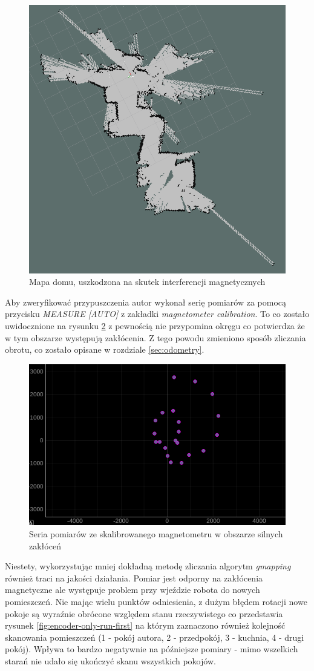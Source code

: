 \begin{figure}[ht]
	\centering
	    \includegraphics[width=0.6\linewidth]{rys/2020-11-04-170347_1920x1080_scrot.PNG}
	\caption{Mapa domu, uszkodzona na skutek interferencji magnetycznych}
	\label{fig:mag-interference-first}
\end{figure}

Aby zweryfikować przypuszczenia autor wykonał serię pomiarów za pomocą przycisku \emph{MEASURE [AUTO]} z zakładki \emph{magnetometer calibration}. To co zostało uwidocznione na rysunku \ref{fig:mag-interference-graph} z pewnością nie przypomina okręgu co potwierdza że w tym obszarze występują zakłócenia. Z tego powodu zmieniono sposób zliczania obrotu, co zostało opisane w rozdziale \ref{sec:odometry}.

\begin{figure}[H]
	\centering
		\includegraphics[width=0.6\linewidth]{rys/calibrated-mag-high-interference-broken-rotation.PNG}
	\caption{Seria pomiarów ze skalibrowanego magnetometru w obszarze silnych zakłóceń}
	\label{fig:mag-interference-graph}
\end{figure}

Niestety, wykorzystując mniej dokładną metodę zliczania algorytm \emph{gmapping} również traci na jakości działania. Pomiar jest odporny na zakłócenia magnetyczne ale występuje problem przy wjeździe robota do nowych pomieszczeń. Nie mając wielu punktów odniesienia, z dużym błędem rotacji nowe pokoje są wyraźnie obrócone względem stanu rzeczywistego co przedstawia rysunek \ref{fig:encoder-only-run-first} na którym zaznaczono również kolejność skanowania pomieszczeń (1 - pokój autora, 2 - przedpokój, 3 - kuchnia, 4 - drugi pokój). Wpływa to bardzo negatywnie na późniejsze pomiary - mimo wszelkich starań nie udało się ukończyć skanu wszystkich pokojów.
\\

